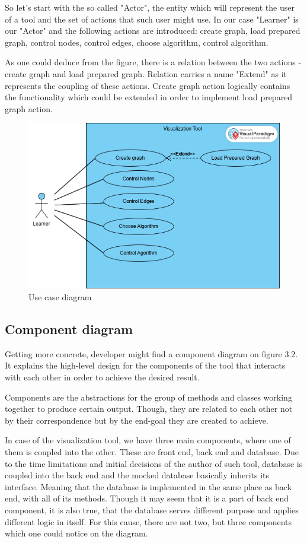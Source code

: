 So let's start with the so called "Actor", the entity which will represent the user of a tool and the set of actions that such user might use. In our case "Learner" is our "Actor" and the following actions are introduced: create graph, load prepared graph, control nodes, control edges, choose algorithm, control algorithm.

As one could deduce from the figure, there is a relation between the two actions - create graph and load prepared graph. Relation carries a name "Extend" as it represents the coupling of these actions. Create graph action logically contains the functionality which could be extended in order to implement load prepared graph action. 

\begin{figure}[H]
	\centering
	\includegraphics[width=\textwidth]{images/use_case_diagram.png}
	\caption{Use case diagram}
\end{figure}

\subsection{Component diagram}

Getting more concrete, developer might find a component diagram on figure 3.2. It explains the high-level design for the components of the tool that interacts with each other in order to achieve the desired result.

Components are the abstractions for the group of methods and classes working together to produce certain output. Though, they are related to each other not by their correspondence but by the end-goal they are created to achieve.

In case of the visualization tool, we have three main components, where one of them is coupled into the other. These are front end, back end and database. Due to the time limitations and initial decisions of the author of such tool, database is coupled into the back end and the mocked database basically inherits its interface. Meaning that the database is implemented in the same place as back end, with all of its methods. Though it may seem that it is a part of back end component, it is also true, that the database serves different purpose and applies different logic in itself. For this cause, there are not two, but three components which one could notice on the diagram.

